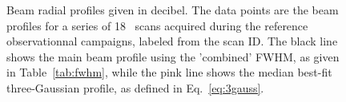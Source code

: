 \begin{figure}[!thbp]
  \caption[Stability of the beam profile]{{\lp Beam radial
    profiles given in decibel. %
    The data points are the beam profiles for a series of 18
    \bm\ scans acquired during the reference observationnal campaigns, labeled from the scan
    ID. The black line shows the main beam profile using the 'combined'
    FWHM, as given in Table~\ref{tab:fwhm}, while the pink
    line shows the median best-fit three-Gaussian profile, as defined
    in Eq.~\ref{eq:3gauss}.}}
  \label{fig:beam_prof}
\end{figure}



